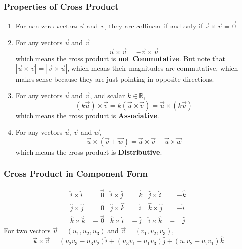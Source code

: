 \documentclass{article}
\newcommand\R{\mathbb{R}}
\newcommand\ihat{\hat i}
\newcommand\jhat{\hat j}
\newcommand\khat{\hat k}
\theoremstyle{definition}
\numberwithin{equation}{section}
\begin{document}
\subsubsection{Properties of Cross Product}
\begin{enumerate}
	\item For non-zero vectors $\vec u$ and $\vec v$, they are collinear if and only if $\vec u \times \vec v = \vec 0$.
	\item For any vectors $\vec u$ and $\vec v$
		\begin{equation*}
			\vec u \times \vec v = - \vec v \times \vec u
		\end{equation*}
		which means the cross product is \textbf{not Commutative}. But note that $|\vec u \times \vec v| = |\vec v \times \vec u|$, which means their magnitudes are commutative, which makes sense because they are just pointing in opposite directions.
	\item  For any vectors $\vec u$ and $\vec v$, and scalar $k \in \R$,
		\begin{equation*}
			(k\vec u) \times \vec v = k (\vec u \times \vec v) = \vec u \times (k\vec v)
		\end{equation*}
		which means the cross product is \textbf{Associative}.
	\item For any vectors $\vec u$, $\vec v$ and $\vec w$,
		\begin{equation*}
			\vec u \times ( \vec v + \vec w ) = \vec u \times \vec v + \vec u \times \vec w
		\end{equation*}
		which means the cross product is \textbf{Distributive}.
\end{enumerate}

\subsubsection{Cross Product in Component Form}
\begin{align*}
	\ihat \times \ihat &= \vec 0 & \ihat \times \jhat &= \khat & \jhat \times \ihat &= - \khat \\
	\jhat \times \jhat &= \vec 0 & \jhat \times \khat &= \ihat & \khat \times \jhat &= - \ihat \\
	\khat \times \khat &= \vec 0 & \khat \times \ihat &= \jhat & \ihat \times \khat &= - \jhat
\end{align*}
For two vectors $\vec u = (u_1,u_2,u_3)$ and $\vec v = (v_1,v_2,v_3)$,
\begin{equation}
	\vec u \times \vec v = (u_2v_3-u_3v_2)\ihat + (u_3v_1-u_1v_3)\jhat + (u_1v_2-u_2v_1)\khat
\end{equation}
\end{document}
